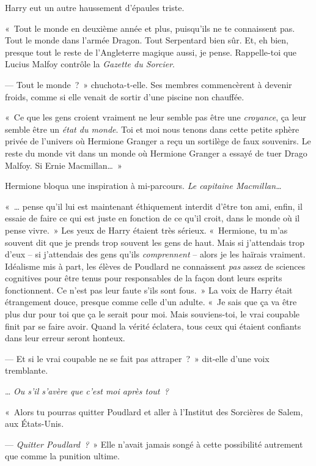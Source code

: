 Harry eut un autre haussement d'épaules triste.

«~Tout le monde en deuxième année et plus, puisqu'ils ne te connaissent pas. Tout le monde dans l'armée Dragon. Tout Serpentard bien sûr. Et, eh bien, presque tout le reste de l'Angleterre magique aussi, je pense. Rappelle-toi que Lucius Malfoy contrôle la \emph{Gazette du Sorcier}.

--- Tout le monde~?~» chuchota-t-elle. Ses membres commencèrent à devenir froids, comme si elle venait de sortir d'une piscine non chauffée.

«~Ce que les gens croient vraiment ne leur semble pas être une \emph{croyance}, ça leur semble être un \emph{état du monde}. Toi et moi nous tenons dans cette petite sphère privée de l'univers où Hermione Granger a reçu un sortilège de faux souvenirs. Le reste du monde vit dans un monde où Hermione Granger a essayé de tuer Drago Malfoy. Si Ernie Macmillan…~»

Hermione bloqua une inspiration à mi-parcours. \emph{Le capitaine Macmillan…}

«~… pense qu'il lui est maintenant éthiquement interdit d'être ton ami, enfin, il essaie de faire ce qui est juste en fonction de ce qu'il croit, dans le monde où il pense vivre.~» Les yeux de Harry étaient très sérieux. «~Hermione, tu m'as souvent dit que je prends trop souvent les gens de haut. Mais si j'attendais trop d'eux -- si j'attendais des gens qu'ils \emph{comprennent} -- alors je les haïrais vraiment. Idéalisme mis à part, les élèves de Poudlard ne connaissent \emph{pas} assez de sciences cognitives pour être tenus pour responsables de la façon dont leurs esprits fonctionnent. Ce n'est pas leur faute s'ils sont fous.~» La voix de Harry était étrangement douce, presque comme celle d'un adulte. «~Je sais que ça va être plus dur pour toi que ça le serait pour moi. Mais souviens-toi, le vrai coupable finit par se faire avoir. Quand la vérité éclatera, tous ceux qui étaient confiants dans leur erreur seront honteux.

--- Et si le vrai coupable ne se fait pas attraper~?~» dit-elle d'une voix tremblante.

… \emph{Ou s'il s'avère que c'est moi après tout~?}

«~Alors tu pourras quitter Poudlard et aller à l'Institut des Sorcières de Salem, aux États-Unis.

--- \emph{Quitter Poudlard~?}~» Elle n'avait jamais songé à cette possibilité autrement que comme la punition ultime.

